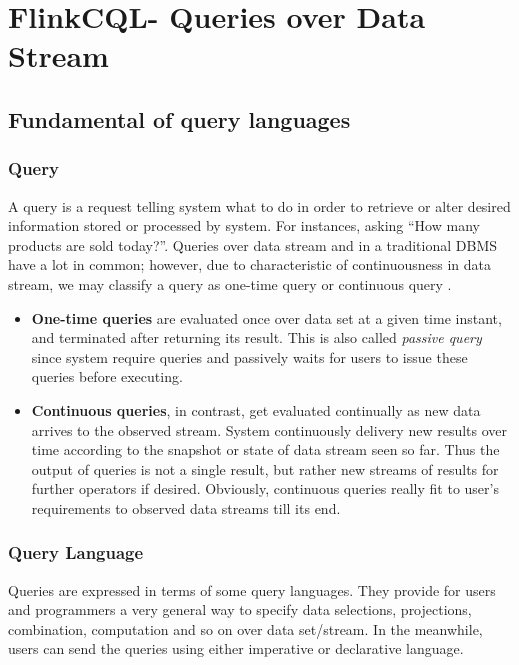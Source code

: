 \chapter{FlinkCQL- Queries over Data Stream}

\ifpdf
    \graphicspath{{Chapter4/Figs/Raster/}{Chapter4/Figs/PDF/}{Chapter4/Figs/}}
\else
    \graphicspath{{Chapter4/Figs/Vector/}{Chapter4/Figs/}}
\fi

\section{Fundamental of query languages}
\subsection*{Query}

A query is a request telling system what to do in order to retrieve or alter desired information stored or processed by system. For instances, asking ``How many products are sold today?''. Queries over data stream and in a traditional DBMS have a lot in common; however, due to characteristic of continuousness in data stream, we may classify a query as one-time query or continuous query \citep{Terry:1992} \citep{Babcock:2002}. 
\begin{itemize}
	\item \textbf{One-time queries} are evaluated once over data set at a given time instant, and terminated after returning its result. This is also called \textit{passive query} \citep{SmartVotex:2011} since system require queries and passively waits for users to issue these queries before executing. 
	\item \textbf{Continuous queries}, in contrast, get evaluated continually as new data arrives to the observed stream. System continuously delivery new results  over time according to the snapshot or state of data stream seen so far. Thus the output of queries is not a single result, but rather new streams of results for further operators if desired. Obviously, continuous queries really fit to user's requirements to observed data streams till its end. 
\end{itemize}


\subsection*{Query Language}
Queries are expressed in terms of some query languages. They provide for users and programmers a very general way to specify data selections, projections, combination, computation and so on over data set/stream. In the meanwhile, users can send the queries using either imperative or declarative language.

